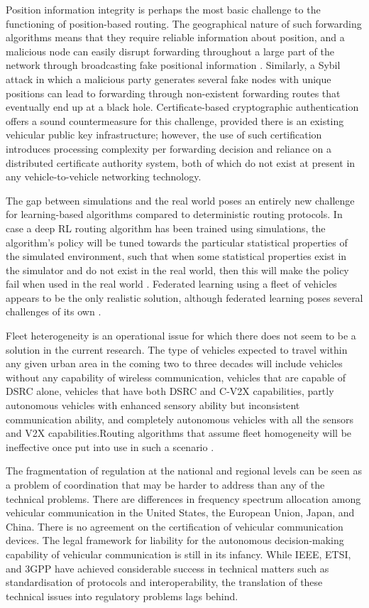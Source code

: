 \documentclass[12pt]{article}
\begin{document}
Position information integrity is perhaps the most basic challenge to the functioning of position-based routing. The geographical nature of such forwarding algorithms means that they require reliable information about position, and a malicious node can easily disrupt forwarding throughout a large part of the network through broadcasting fake positional information \cite{zheng2015heterogeneous}. Similarly, a Sybil attack in which a malicious party generates several fake nodes with unique positions can lead to forwarding through non-existent forwarding routes that eventually end up at a black hole. Certificate-based cryptographic authentication offers a sound countermeasure for this challenge, provided there is an existing vehicular public key infrastructure; however, the use of such certification introduces processing complexity per forwarding decision and reliance on a distributed certificate authority system, both of which do not exist at present in any vehicle-to-vehicle networking technology.

The gap between simulations and the real world poses an entirely new challenge for learning-based algorithms compared to deterministic routing protocols. In case a deep RL routing algorithm has been trained using simulations, the algorithm’s policy will be tuned towards the particular statistical properties of the simulated environment, such that when some statistical properties exist in the simulator and do not exist in the real world, then this will make the policy fail when used in the real world \cite{mnih2015human}. Federated learning using a fleet of vehicles appears to be the only realistic solution, although federated learning poses several challenges of its own \cite{silva2022federated}.

Fleet heterogeneity is an operational issue for which there does not seem to be a solution in the current research. The type of vehicles expected to travel within any given urban area in the coming two to three decades will include vehicles without any capability of wireless communication, vehicles that are capable of DSRC alone, vehicles that have both DSRC and C-V2X capabilities, partly autonomous vehicles with enhanced sensory ability but inconsistent communication ability, and completely autonomous vehicles with all the sensors and V2X capabilities.Routing algorithms that assume fleet homogeneity will be ineffective once put into use in such a scenario \cite{li2007routing}.

The fragmentation of regulation at the national and regional levels can be seen as a problem of coordination that may be harder to address than any of the technical problems. There are differences in frequency spectrum allocation among vehicular communication in the United States, the European Union, Japan, and China. There is no agreement on the certification of vehicular communication devices. The legal framework for liability for the autonomous decision-making capability of vehicular communication is still in its infancy. While IEEE, ETSI, and 3GPP have achieved considerable success in technical matters such as standardisation of protocols and interoperability, the translation of these technical issues into regulatory problems lags behind.
\end{document}
